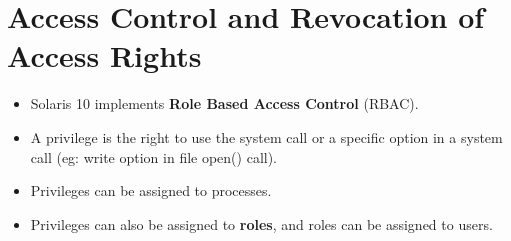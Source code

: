 \documentclass{article}
\theoremstyle{plain}
\theoremstyle{definition}
\begin{document}
\section{Access Control and Revocation of Access Rights}
\begin{itemize}
    \item Solaris 10 implements \textbf{Role Based Access Control} (RBAC). 
    
    \item A privilege is the right to use the system call or a specific option in a system call (eg: write option in file open() call). 
    
    \item Privileges can be assigned to processes. 
    
    \item Privileges can also be assigned to \textbf{roles}, and roles can be assigned to users. 
\end{itemize}
\end{document}
